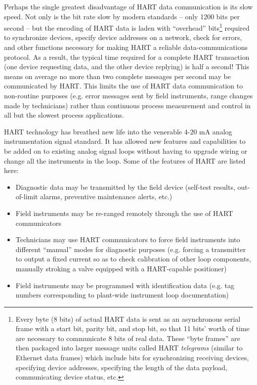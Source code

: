 Perhaps the single greatest disadvantage of HART data communication is its slow speed.  Not only is the bit rate slow by modern standards -- only 1200 bits per second -- but the encoding of HART data is laden with ``overhead'' bits\footnote{Every byte (8 bits) of actual HART data is sent as an asynchronous serial frame with a start bit, parity bit, and stop bit, so that 11 bits' worth of time are necessary to communicate 8 bits of real data.  These ``byte frames'' are then packaged into larger message units called HART \textit{telegrams} (similar to Ethernet data frames) which include bits for synchronizing receiving devices, specifying device addresses, specifying the length of the data payload, communicating device status, etc.} required to synchronize devices, specify device addresses on a network, check for errors, and other functions necessary for making HART a reliable data-communications protocol.  As a result, the typical time required for a complete HART transaction (one device requesting data, and the other device replying) is half a second!  This means on average no more than two complete messages per second may be communicated by HART.  This limits the use of HART data communication to non-routine purposes (e.g. error messages sent by field instruments, range changes made by technicians) rather than continuous process measurement and control in all but the slowest process applications.

\vskip 10pt

\filbreak

HART technology has breathed new life into the venerable 4-20 mA analog instrumentation signal standard.  It has allowed new features and capabilities to be added on to existing analog signal loops without having to upgrade wiring or change all the instruments in the loop.  Some of the features of HART are listed here:

\begin{itemize}
\item Diagnostic data may be transmitted by the field device (self-test results, out-of-limit alarms, preventive maintenance alerts, etc.)
\item Field instruments may be re-ranged remotely through the use of HART communicators
\item Technicians may use HART communicators to force field instruments into different ``manual'' modes for diagnostic purposes (e.g. forcing a transmitter to output a fixed current so as to check calibration of other loop components, manually stroking a valve equipped with a HART-capable positioner)
\item Field instruments may be programmed with identification data (e.g. tag numbers corresponding to plant-wide instrument loop documentation)
\end{itemize}

